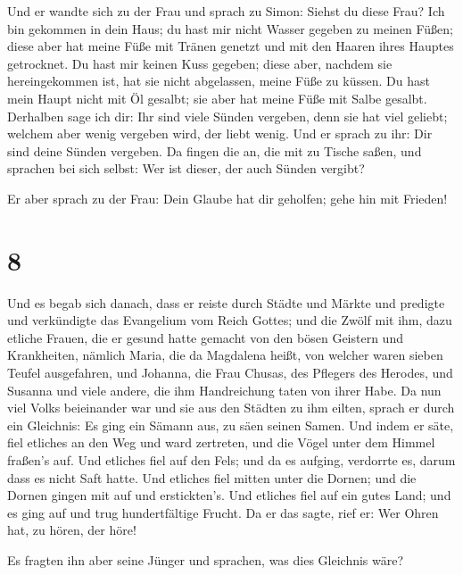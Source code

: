  Und er wandte sich zu der Frau und sprach zu Simon:
Siehst du diese Frau? Ich bin gekommen in dein Haus; du hast mir nicht
Wasser gegeben zu meinen Füßen; diese aber hat meine Füße mit Tränen
genetzt und mit den Haaren ihres Hauptes getrocknet.  Du
hast mir keinen Kuss gegeben; diese aber, nachdem sie hereingekommen
ist, hat sie nicht abgelassen, meine Füße zu küssen.  Du
hast mein Haupt nicht mit Öl gesalbt; sie aber hat meine Füße mit Salbe
gesalbt.  Derhalben sage ich dir: Ihr sind viele Sünden
vergeben, denn sie hat viel geliebt; welchem aber wenig vergeben wird,
der liebt wenig.  Und er sprach zu ihr: Dir sind deine
Sünden vergeben.  Da fingen die an, die mit zu Tische
saßen, und sprachen bei sich selbst: Wer ist dieser, der auch Sünden
vergibt?

 Er aber sprach zu der Frau: Dein Glaube hat dir
geholfen; gehe hin mit Frieden!

\hypertarget{section-7}{%
\section{8}\label{section-7}}

 Und es begab sich danach, dass er reiste durch Städte und
Märkte und predigte und verkündigte das Evangelium vom Reich Gottes; und
die Zwölf mit ihm,  dazu etliche Frauen, die er gesund
hatte gemacht von den bösen Geistern und Krankheiten, nämlich Maria, die
da Magdalena heißt, von welcher waren sieben Teufel ausgefahren,
 und Johanna, die Frau Chusas, des Pflegers des Herodes,
und Susanna und viele andere, die ihm Handreichung taten von ihrer Habe.
 Da nun viel Volks beieinander war und sie aus den Städten
zu ihm eilten, sprach er durch ein Gleichnis:  Es ging ein
Sämann aus, zu säen seinen Samen. Und indem er säte, fiel etliches an
den Weg und ward zertreten, und die Vögel unter dem Himmel fraßen's auf.
 Und etliches fiel auf den Fels; und da es aufging,
verdorrte es, darum dass es nicht Saft hatte.  Und
etliches fiel mitten unter die Dornen; und die Dornen gingen mit auf und
erstickten's.  Und etliches fiel auf ein gutes Land; und
es ging auf und trug hundertfältige Frucht. Da er das sagte, rief er:
Wer Ohren hat, zu hören, der höre!

 Es fragten ihn aber seine Jünger und sprachen, was dies
Gleichnis wäre?

